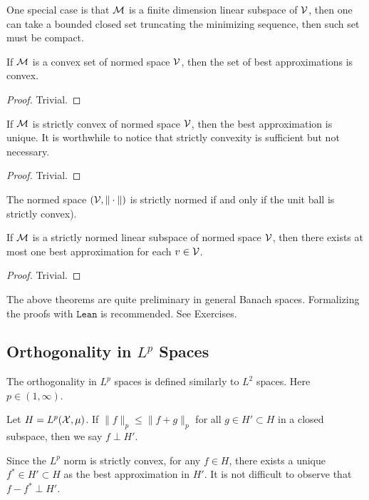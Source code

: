 One special case is that $\mathcal M$ is a finite dimension linear subspace of $\mathcal V$, then one can take a bounded closed set truncating the minimizing sequence, then such set must be compact.
\begin{lemma}[convexity]
\label{Lem: 4-CON}
If $\mathcal M$ is a convex set of normed space $\mathcal V$, then the set of best approximations is convex.
\end{lemma}
\begin{proof}
Trivial.    
\end{proof}
\begin{theorem}[uniqueness]
\label{Thm: 4-Uni-1}
    If $\mathcal M$ is strictly convex of normed space $\mathcal V$, then the best approximation is unique. It is worthwhile to notice that strictly convexity is sufficient but not necessary.
\end{theorem}
\begin{proof}
    Trivial.
\end{proof}
\begin{definition}
   The normed space $(\mathcal V, \|\cdot\|)$ is strictly normed if and only if the unit ball is strictly convex).
\end{definition}
\begin{theorem}[uniqueness]
\label{Thm: 4-Uni-2}
    If $\mathcal M$ is a strictly normed linear subspace of normed space $\mathcal V$, then there exists at most one best approximation for each $v\in\mathcal V$.
\end{theorem}
\begin{proof}
    Trivial.
\end{proof}

\begin{remark}
    The above theorems are quite preliminary in general Banach spaces. Formalizing the proofs with $\texttt{Lean}$ is recommended. See Exercises.  
\end{remark}
\subsection{Orthogonality in \texorpdfstring{$L^p$} - Spaces}
The orthogonality in $L^p$ spaces is defined similarly to $L^2$ spaces. Here $p\in(1,\infty)$.
\begin{definition}
    Let $H = L^p(\mathcal X, \mu)$. If $\|f\|_p\le \|f + g\|_p$ for all $g\in H'\subset H$ in a closed subspace, then we say $f\perp H'$. 
\end{definition}
Since the $L^p$ norm is strictly convex, for any $f\in H$, there exists a unique $f^{\ast}\in H'\subset H$ as the best approximation in $H'$. It is not difficult to observe that $f-f^{\ast}\perp H'$. 

